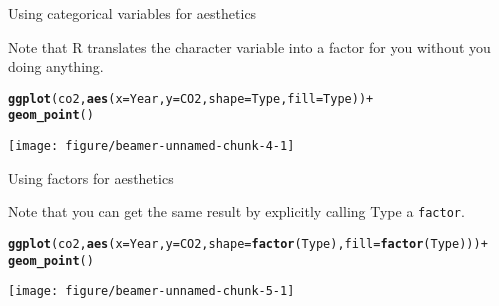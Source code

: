 \documentclass[table]{beamer}\usepackage[]{graphicx}\usepackage[]{color}
\makeatletter
\def\maxwidth{ %
  \ifdim\Gin@nat@width>\linewidth
    \linewidth
  \else
    \Gin@nat@width
  \fi
}
\newcommand{\hlopt}[1]{\textcolor[rgb]{0,0,0}{#1}}%
\newcommand{\hlstd}[1]{\textcolor[rgb]{0.345,0.345,0.345}{#1}}%
\newcommand{\hlkwc}[1]{\textcolor[rgb]{0.333,0.667,0.333}{#1}}%
\newcommand{\hlkwd}[1]{\textcolor[rgb]{0.737,0.353,0.396}{\textbf{#1}}}%
\newenvironment{kframe}{%
 \def\at@end@of@kframe{}%
 \ifinner\ifhmode%
  \def\at@end@of@kframe{\end{minipage}}%
  \begin{minipage}{\columnwidth}%
 \fi\fi%
 \def\FrameCommand##1{\hskip\@totalleftmargin \hskip-\fboxsep
 \colorbox{shadecolor}{##1}\hskip-\fboxsep
     \hskip-\linewidth \hskip-\@totalleftmargin \hskip\columnwidth}%
 \MakeFramed {\advance\hsize-\width
   \@totalleftmargin\z@ \linewidth\hsize
   \@setminipage}}%
 {\par\unskip\endMakeFramed%
 \at@end@of@kframe}
\newenvironment{knitrout}{}{} %
\makeatother
\begin{document}

\begin{frame}[fragile]{Using categorical variables for aesthetics}

Note that R translates the character variable into a factor for you without you doing anything.

\begin{knitrout}\tiny
{}\color{fgcolor}\begin{kframe}
\begin{alltt}
\hlkwd{ggplot}\hlstd{(co2,} \hlkwd{aes}\hlstd{(}\hlkwc{x} \hlstd{= Year,} \hlkwc{y} \hlstd{= CO2,} \hlkwc{shape} \hlstd{= Type,} \hlkwc{fill} \hlstd{= Type))}\hlopt{+}
  \hlkwd{geom_point}\hlstd{()}
\end{alltt}
\end{kframe}

{\centering \texttt{[image: figure/beamer-unnamed-chunk-4-1]} 

}


\end{knitrout}

\end{frame}


\begin{frame}[fragile]{Using factors for aesthetics}

Note that you can get the same result by explicitly calling Type a {\tt factor}.

\begin{knitrout}\tiny
{}\color{fgcolor}\begin{kframe}
\begin{alltt}
\hlkwd{ggplot}\hlstd{(co2,} \hlkwd{aes}\hlstd{(}\hlkwc{x} \hlstd{= Year,} \hlkwc{y} \hlstd{= CO2,} \hlkwc{shape} \hlstd{=} \hlkwd{factor}\hlstd{(Type),} \hlkwc{fill} \hlstd{=} \hlkwd{factor}\hlstd{(Type)))}\hlopt{+}
  \hlkwd{geom_point}\hlstd{()}
\end{alltt}
\end{kframe}

{\centering \texttt{[image: figure/beamer-unnamed-chunk-5-1]} 

}


\end{knitrout}

\end{frame}
\end{document}
